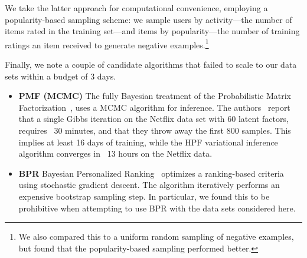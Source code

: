 We take the latter approach for computational convenience, employing a
popularity-based sampling scheme: we sample users by activity---the
number of items rated in the training set---and items by
popularity---the number of training ratings an item received to
generate negative examples.\footnote{We also compared this to a
  uniform random sampling of negative examples, but found that the
  popularity-based sampling performed better.} 


Finally, we note a couple of candidate algorithms that failed to scale
to our data sets within a budget of 3 days.  

\begin{itemize}
\item {\bf PMF (MCMC)} The fully Bayesian treatment of the
  Probabilistic Matrix Factorization~\cite{Salakhutdinov:2008}, uses a
  MCMC algorithm for inference. The authors~\cite{Salakhutdinov:2008}
  report that a single Gibbs iteration on the Netflix data set with 60
  latent factors, requires ~30 minutes, and that they throw away the
  first 800 samples. This implies at least 16 days of training, while
  the HPF variational inference algorithm converges in ~13 hours on
  the Netflix data.

\item {\bf BPR} Bayesian Personalized
  Ranking~\cite{Rendle:2009p9243,Gantner:2012p9364} optimizes a
  ranking-based criteria using stochastic gradient descent. The
  algorithm iteratively performs an expensive bootstrap sampling step.
  In particular, we found this to be prohibitive when attempting to
  use BPR with the data sets considered here.
\end{itemize}





